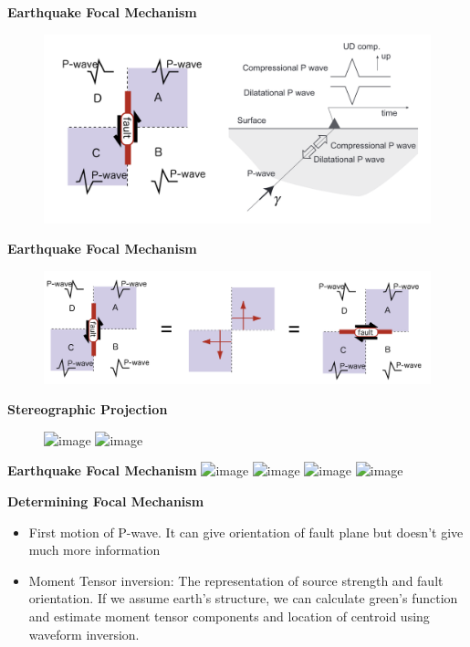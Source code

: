 \documentclass[11pt]{beamer}
\begin{document}
\begin{frame}{\textbf{Earthquake Focal Mechanism}}
    \begin{figure}
        \includegraphics[width=1\linewidth]{images/fm1}
    \end{figure}
\end{frame}
\begin{frame}{\textbf{Earthquake Focal Mechanism}}
    \begin{figure}
        \includegraphics[width=1\linewidth]{images/fm2}
    \end{figure}
\end{frame}
\begin{frame}{\textbf{Stereographic Projection}}
    \begin{figure}
        \includegraphics<1>[width=1\linewidth]{images/stereo2}
        \includegraphics<2>[width=1\linewidth]{images/stereo}
    \end{figure}
\end{frame}
\begin{frame}{\textbf{Earthquake Focal Mechanism}}
        \includegraphics<3>[width=0.5\linewidth]{images/nfm} 
        \includegraphics<1>[width=0.5\linewidth]{images/rfm}
        \includegraphics<2>[width=0.5\linewidth]{images/ssfm}
        \includegraphics<4>[width=0.5\linewidth]{images/osfm}
\end{frame}

\begin{frame}{\textbf{Determining Focal Mechanism}}
    \begin{itemize}
        \item<1-> First motion of P-wave. It can give orientation of fault plane but doesn't give much more information
        \item<2-> Moment Tensor inversion: The representation of source strength and fault orientation. If we assume earth's structure, we can calculate green's function and estimate moment tensor components and location of centroid using waveform inversion.
    \end{itemize}
\end{frame}
\end{document}
